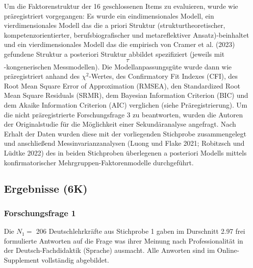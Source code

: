 \documentclass[
  letterpaper,
  DIV=11]{scrartcl}
\begin{document}
Um die Faktorenstruktur der 16 geschlossenen Items zu evaluieren, wurde
wie präregistriert vorgegangen: Es wurde ein eindimensionales Modell,
ein vierdimensionales Modell das die a priori Struktur
(strukturtheoretischer, kompetenzorientierter, berufsbiografischer und
metareflektiver Ansatz)-beinhaltet und ein vierdimensionales Modell das
die empirisch von Cramer et al. (2023) gefundene Struktur a posteriori
Struktur abbildet spezifiziert (jeweils mit \[\tau\]-kongenerischen
Messmodellen). Die Modellanpassungsgüte wurde dann wie präregistriert
anhand des \(\chi^2\)-Wertes, des Confirmatory Fit Indexes (CFI), des
Root Mean Square Error of Approximation (RMSEA), den Standardized Root
Mean Square Residuals (SRMR), dem Bayesian Information Criterion (BIC)
und dem Akaike Information Criterion (AIC) verglichen (siehe
Präregistrierung). Um die nicht präregistrierte Forschungsfrage 3 zu
beantworten, wurden die Autoren der Originalstudie für die Möglichkeit
einer Sekundäranalyse angefragt. Nach Erhalt der Daten wurden diese mit
der vorliegenden Stichprobe zusammengelegt und anschließend
Messinvarianzanalysen (Luong und Flake 2021; Robitzsch und Lüdtke 2022)
des in beiden Stichproben überlegenen a posteriori Modells mittels
konfirmatorischer Mehrgruppen-Faktorenmodelle durchgeführt.

\subsection{Ergebnisse (6K)}\label{ergebnisse-6k}

\subsubsection{Forschungsfrage 1}\label{forschungsfrage-1}

Die \(N_1 =\) 206 Deutschlehrkräfte aus Stichprobe 1 gaben im Durschnitt
2.97 frei formulierte Antworten auf die Frage was ihrer Meinung nach
Professionalität in der Deutsch-Fachdidaktik (Sprache) ausmacht. Alle
Anworten sind im Online-Supplement vollständig abgebildet.
\end{document}
